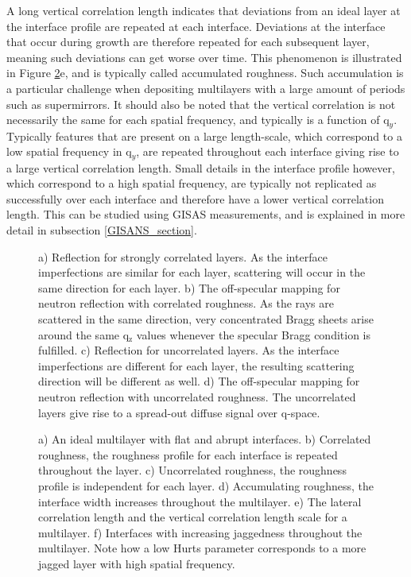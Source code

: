 A long vertical correlation length indicates that deviations from an ideal layer at the interface profile are repeated at each interface. Deviations at the interface that occur during growth are therefore repeated for each subsequent layer, meaning such deviations can get worse over time. This phenomenon is illustrated in Figure \ref{interface_roughnesses}e, and is typically called accumulated roughness. Such accumulation is a particular challenge when depositing multilayers with a large amount of periods such as supermirrors. It should also be noted that the vertical correlation is not necessarily the same for each spatial frequency, and typically is a function of q$_y$. Typically features that are present on a large length-scale, which correspond to a low spatial frequency in q$_y$, are repeated throughout each interface giving rise to a large vertical correlation length. Small details in the interface profile however, which correspond to a high spatial frequency, are typically not replicated as successfully over each interface and therefore have a lower vertical correlation length. This can be studied using GISAS measurements, and is explained in more detail in subsection \ref{GISANS_section}.
\begin{figure}
	\centering
	\def\svgwidth{\textwidth}
	
	\caption{a) Reflection for strongly correlated layers. As the interface imperfections are similar for each layer, scattering will occur in the same direction for each layer. b) The off-specular mapping for neutron reflection with correlated roughness. As the rays are scattered in the same direction, very concentrated Bragg sheets arise around the same q$_\text{z}$ values whenever the specular Bragg condition is fulfilled. c) Reflection for uncorrelated layers. As the interface imperfections are different for each layer, the resulting scattering direction will be different as well. d) The off-specular mapping for neutron reflection with uncorrelated roughness. The uncorrelated layers give rise to a spread-out diffuse signal over q-space.}
	\label{correlated_vs_diffuse}
\end{figure}
\begin{figure}
	\centering
	\def\svgwidth{\textwidth}
	
	\caption{a) An ideal multilayer with flat and abrupt interfaces. b) Correlated roughness, the roughness profile for each interface is repeated throughout the layer. c) Uncorrelated roughness, the roughness profile is independent for each layer. d) Accumulating roughness, the interface width increases throughout the multilayer. e) The lateral correlation length and the vertical correlation length scale for a multilayer. f) Interfaces with increasing jaggedness throughout the multilayer. Note how a low Hurts parameter corresponds to a more jagged layer with high spatial frequency.}
	\label{interface_roughnesses}
\end{figure}
\clearpage
